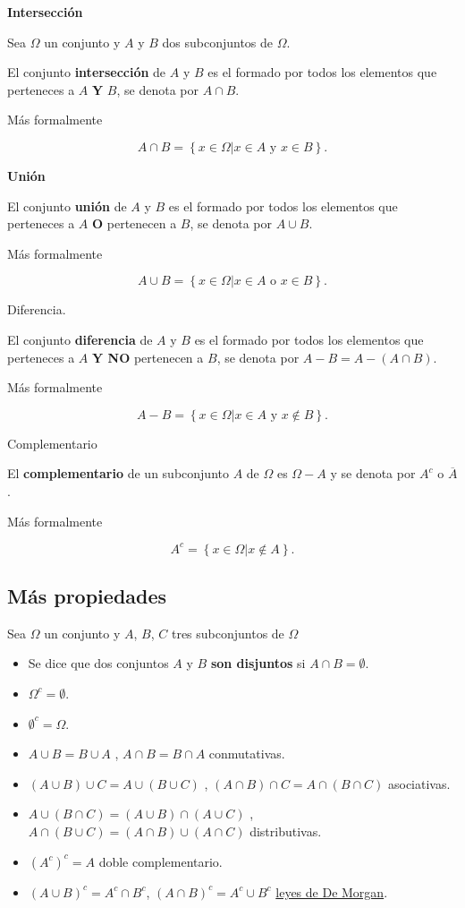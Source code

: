 \documentclass[
  letterpaper,
  DIV=11,
  numbers=noendperiod]{scrreprt}
\providecommand{\tightlist}{%
  \setlength{\itemsep}{0pt}\setlength{\parskip}{0pt}}\usepackage{longtable,booktabs,array}
\begin{document}
\textbf{Intersección}

Sea \(\Omega\) un conjunto y \(A\) y \(B\) dos subconjuntos de
\(\Omega\).

El conjunto \textbf{intersección} de \(A\) y \(B\) es el formado por
todos los elementos que perteneces a \(A\) \textbf{Y} \(B\), se denota
por \(A\cap B\).

Más formalmente

\[
A\cap B=\left\{x\in\Omega \big| x\in A \mbox{ y } x\in B\right\}.
\]

\textbf{Unión}

El conjunto \textbf{unión} de \(A\) y \(B\) es el formado por todos los
elementos que perteneces a \(A\) \textbf{O} pertenecen a \(B\), se
denota por \(A\cup B\).

Más formalmente

\[
A\cup B=\left\{x\in\Omega \big| x\in A \mbox{ o } x\in B\right\}.
\]

Diferencia.

El conjunto \textbf{diferencia} de \(A\) y \(B\) es el formado por todos
los elementos que perteneces a \(A\) \textbf{Y NO} pertenecen a \(B\),
se denota por \(A-B=A-(A\cap B)\).

Más formalmente

\[
A- B=\left\{x\in\Omega \big| x\in A \mbox{ y } x\notin B\right\}.
\]

Complementario

El \textbf{complementario} de un subconjunto \(A\) de \(\Omega\) es
\(\Omega-A\) y se denota por \(A^c\) o \(\overline{A}\).

Más formalmente

\[
A^c=\left\{x\in\Omega \big| x\not\in A\right\}.
\]

\subsection{Más propiedades}\label{muxe1s-propiedades}

Sea \(\Omega\) un conjunto y \(A\), \(B\), \(C\) tres subconjuntos de
\(\Omega\)

\begin{itemize}
\tightlist
\item
  Se dice que dos conjuntos \(A\) y \(B\) \textbf{son disjuntos} si
  \(A\cap B=\emptyset.\)
\item
  \(\Omega^c=\emptyset\).
\item
  \(\emptyset^c=\Omega\).
\item
  \(A\cup B=B \cup A\) , \(A\cap B=B\cap A\) conmutativas.
\item
  \((A\cup B) \cup C = A \cup( B \cup C)\) ,
  \((A\cap B) \cap C = A \cap( B \cap C)\) asociativas.
\item
  \(A\cup (B\cap C)=(A\cup B) \cap (A\cup C)\) ,
  \(A\cap (B\cup C)=(A\cap B) \cup (A\cap C)\) distributivas.
\item
  \(\left(A^c\right)^c=A\) doble complementario.
\item
  \(\left(A\cup B\right)^c=A^c \cap B^c\),
  \(\left(A\cap B\right)^c=A^c \cup B^c\)
  \href{https://es.wikipedia.org/wiki/Leyes_de_De_Morgan}{leyes de De
  Morgan}.
\end{itemize}
\end{document}
